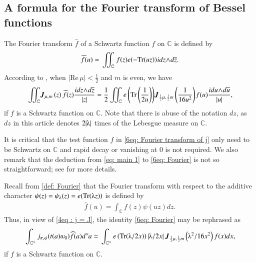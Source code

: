 \documentclass{amsproc}
\newcommand{\BC}{{\mathbb {C}}} \newcommand{\BD}{{\mathbb {D}}}
\def\lp {\left (}
\def\rp {\right )}
\def\BCx{\BC^{\times}}
\renewcommand{\Re}{{\mathrm{Re}\,}}
\def\bfJ {\boldsymbol J}
\def\nwedge {\hskip - 2 pt \wedge \hskip - 2 pt }
\def\shskip{\hskip 0.5 pt}
\def\dx{d^{\times} \hskip -1 pt}
\theoremstyle{plain}
\numberwithin{equation}{section}
\begin{document}
	\subsection{A formula for the Fourier transform of Bessel functions} The Fourier transform $\widehat f  $ of a Schwartz  function $f$ on $\BC$ is defined by
	\begin{equation*}%
	\widehat f (u) = \sideset{ }{_\BC }{\iint} \shskip  f (z) e(- \Tr  (uz) ) \shskip  i d z   \nwedge   d \overline z.
	\end{equation*}
According to \cite[Corollary 1.5]{Qi-II-G}, when $|\Re \mu | < \frac 1 2$ and $m$ is even, we have
	\begin{equation}\label{6eq: Fourier}
	\begin{split}
	\sideset{ }{_{\BC } }{\iint}  \hskip - 2 pt   \bfJ_{\mu,\shskip  m} \lp z \rp    \widehat f (z)  \frac {i d z   \nwedge   d \overline z} {  {|z|}}   = \frac  1 2 \sideset{ }{_{\BC } }{\iint}     e \lp \Tr  \lp \frac 1 {2 u} \rp \rp \hskip - 2 pt \bfJ_{\frac 1 2 \mu,\shskip  \frac 1 2 m} \lp  \frac 1  { 16 u ^{ 2} } \rp \hskip - 1 pt f (u) \frac {i d u  \nwedge  d \overline u} {  {|u|}},
	\end{split}
	\end{equation}
	if $f$ is a Schwartz function on $\BC$. Note that there is abuse of the notation $d z$, as $d z$ in this article denotes $2 |\lambdaup|$ times of the Lebesgue measure on $\BC$.
	
	It is critical that  the test function $f$ in \eqref{6eq: Fourier transform of j} only need to be Schwartz on $\BC$ and rapid decay or vanishing at $0$ is not required. We also remark that the deduction from  \eqref{eq: main 1} to \eqref{6eq: Fourier} is   not so straightforward; see \cite[\S 6]{Qi-II-G} for more details.
	
	Recall from \eqref{def: Fourier} that the  Fourier transform with respect to the additive character $\psi (z) = \psi_{\lambdaup} (z) = e(\Tr(\lambdaup z))$ is defined by
	\begin{align*}
	\widehat f (u) = \int_{ \BC} f (z) \psi  (uz) d z.
	\end{align*}
	Thus, in view of \eqref{4eq : j = J}, %
	the identity \eqref{6eq: Fourier} may be rephrased as
	\begin{align} \label{6eq: Fourier transform of j}
	\sideset{ }{_{\BCx} }{\int}   j_{\pi, \shskip \psi} ( t(a) \varw_0 )    \widehat f (a)   \dx  a
	=     \sideset{ }{_{\BCx} }{\int}       e \lp \Tr ({\lambdaup} / {2 x} )  \rp \left| \lambdaup / 2 x \right|  \bfJ_{\frac 1 2 \mu,\shskip  \frac 1 2 m} \lp \lambdaup^2 / 16 x^2 \rp  f (x ) {  d x   }  ,
	\end{align}
	if $f$ is a Schwartz function on $\BC$.
	
\end{document}
